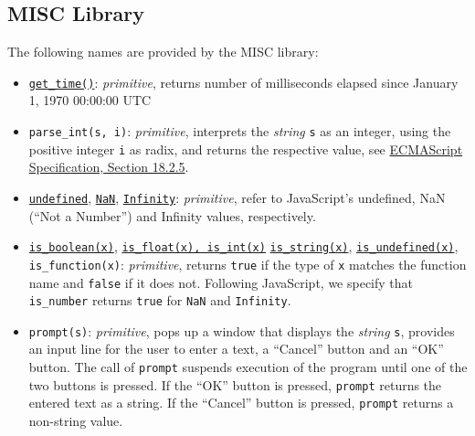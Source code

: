 \subsection*{MISC Library}


The following
names are provided by the MISC library:
\begin{itemize}
\item \href{https://sourceacademy.org/sicpjs/1.2.6\#ex_1.22}{\lstinline{get_time()}}: \textit{primitive}, returns number of milliseconds elapsed since January 1, 1970 00:00:00 UTC
\item \verb#parse_int#\texttt{(s, i)}: \textit{primitive}, 
interprets the \emph{string} \texttt{s} as an integer, using the positive integer \texttt{i} as radix, and returns the respective value,
see \href{https://www.ecma-international.org/ecma-262/9.0/index.html\#sec-parseint-string-radix}{\color{DarkBlue}ECMAScript Specification, Section 18.2.5}.
\item \href{https://sourceacademy.org/sicpjs/2.4.3\#p6}{\texttt{undefined}},
  \texttt{\href{https://www.ecma-international.org/ecma-262/9.0/index.html\#sec-value-properties-of-the-global-object-nan}{\color{DarkBlue}NaN}}, \texttt{\href{https://www.ecma-international.org/ecma-262/9.0/index.html\#sec-value-properties-of-the-global-object-infinity}{\color{DarkBlue}Infinity}}: \textit{primitive}, refer to JavaScript's undefined,
NaN (``Not a Number'') and Infinity values, respectively.
\item \href{https://sourceacademy.org/sicpjs/4.1.2\#p2}{\lstinline{is_boolean(x)}}, \href{https://sourceacademy.org/sicpjs/2.3.2\#p5}{\lstinline{is_float(x), is_int(x)}}
  \href{https://sourceacademy.org/sicpjs/2.3.2\#p7}{\lstinline{is_string(x)}}, \href{https://sourceacademy.org/sicpjs/4.1.2\#p2}{\lstinline{is_undefined(x)}}, \verb#is_function#\texttt{(x)}: \textit{primitive}, returns \texttt{true} if the type of \texttt{x} matches the function name and \texttt{false} if it does not. Following
        JavaScript, we specify that \verb#is_number# returns \texttt{true} for \texttt{NaN} and \texttt{Infinity}.
\item \texttt{prompt(s)}: \textit{primitive}, pops up a window that displays the \emph{string} \texttt{s}, provides
an input line for the user to enter a text, a ``Cancel'' button and an ``OK'' button. The call of \texttt{prompt}
suspends execution of the program until one of the two buttons is pressed. If 
the ``OK'' button is pressed, \texttt{prompt} returns the entered text as a string.
If the ``Cancel'' button is pressed, \texttt{prompt} returns a non-string value.

\end{itemize}
